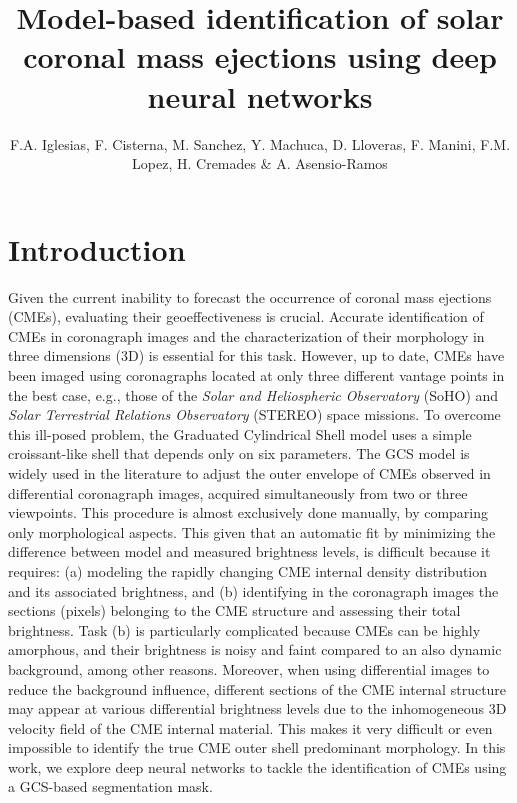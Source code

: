 \documentclass[baaa]{baaa}
\title{Model-based identification of solar coronal mass ejections using deep neural networks}
\author{
F.A. Iglesias\inst{1,2},
F. Cisterna\inst{1},
M. Sanchez\inst{1},
Y. Machuca\inst{1},
D. Lloveras\inst{1,2},
F. Manini\inst{1,2},
F.M. Lopez\inst{1,2},
H. Cremades\inst{1,2}
\&
A. Asensio-Ramos\inst{3}
}
\institute{
Grupo de Estudios en Heliofísica de Mendoza (GEHMe), Universidad de Mendoza, Argentina, 
\and
Consejo Nacional de Investigaciones Científicas y Técnicas, Argentina
 \and
Instituto de Astrofísica de Canarias, España 
}
\begin{document}
\maketitle
\section{Introduction}\label{S_intro}
Given the current inability to forecast the occurrence of coronal mass ejections (CMEs), evaluating their geoeffectiveness is crucial. Accurate identification of CMEs in coronagraph images and the characterization of their morphology in three dimensions (3D) is essential for this task. However, up to date, CMEs have been imaged using coronagraphs located at only three different vantage points in the best case, e.g., those of the \textit{Solar and Heliospheric Observatory} (SoHO) and \textit{Solar Terrestrial Relations Observatory} (STEREO) space missions. To overcome this ill-posed problem, the Graduated Cylindrical Shell model \citep{Thernisien-etal2009} uses a simple croissant-like shell that depends only on six parameters. The GCS model is widely used in the literature to adjust the outer envelope of CMEs observed in differential coronagraph images, acquired simultaneously from two or three viewpoints. This procedure is almost exclusively done manually, by comparing only morphological aspects. This given that an automatic fit by minimizing the difference between model and measured brightness levels, is difficult because it requires: (a) modeling the rapidly changing CME internal density distribution and its associated brightness, and (b) identifying in the coronagraph images the sections (pixels) belonging to the CME structure and assessing their total brightness. Task (b) is particularly complicated because CMEs can be highly amorphous, and their brightness is noisy and faint compared to an also dynamic background, among other reasons. Moreover, when using differential images to reduce the background influence, different sections of the CME internal structure may appear at various differential brightness levels due to the inhomogeneous 3D velocity field of the CME internal material. This makes it very difficult or even impossible to identify the true CME outer shell predominant morphology. In this work, we explore deep neural networks to tackle the identification of CMEs using a GCS-based segmentation mask.
\end{document}
